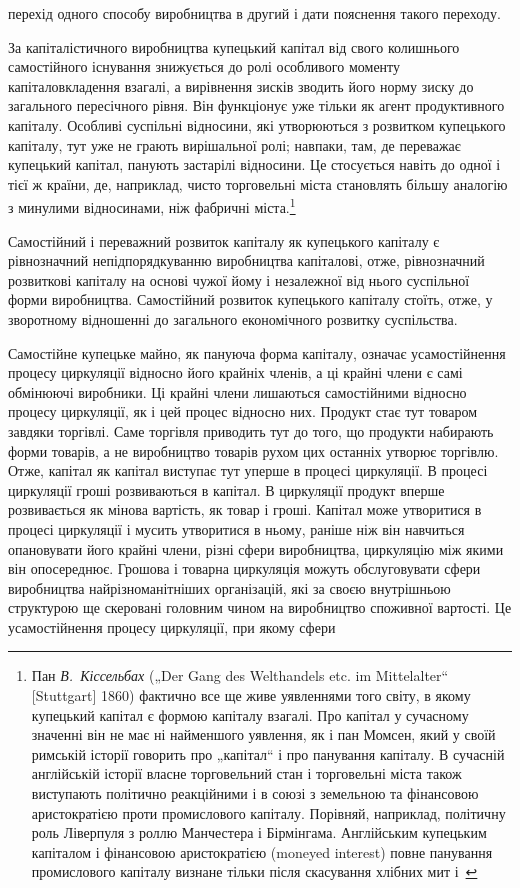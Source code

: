 \parcont{}  %
перехід одного способу виробництва в другий і дати пояснення
такого переходу.

За капіталістичного виробництва купецький капітал від свого
колишнього самостійного існування знижується до ролі особливого
моменту капіталовкладення взагалі, а вирівнення зисків
зводить його норму зиску до загального пересічного рівня. Він
функціонує уже тільки як агент продуктивного капіталу. Особливі
суспільні відносини, які утворюються з розвитком купецького
капіталу, тут уже не грають вирішальної ролі; навпаки, там,
де переважає купецький капітал, панують застарілі відносини.
Це стосується навіть до одної і тієї ж країни, де, наприклад,
чисто торговельні міста становлять більшу аналогію з минулими
відносинами, ніж фабричні міста.\footnote{
Пан \emph{В.~Кіссельбах} („Der Gang des Welthandels etc. im Mittelalter“ [Stuttgart]
1860) фактично все ще живе уявленнями того світу, в якому купецький
капітал є формою капіталу взагалі. Про капітал у сучасному значенні він не
має ні найменшого уявлення, як і пан Момсен, який у своїй римській історії
говорить про „капітал“ і про панування капіталу. В сучасній англійській історії
власне торговельний стан і торговельні міста також виступають політично
реакційними і в союзі з земельною та фінансовою аристократією проти промислового
капіталу. Порівняй, наприклад, політичну роль Ліверпуля з роллю Манчестера
і Бірмінгама. Англійським купецьким капіталом і фінансовою аристократією
(moneyed interest) повне панування промислового капіталу визнане
тільки після скасування хлібних мит і~
}

Самостійний і переважний розвиток капіталу як купецького
капіталу є рівнозначний непідпорядкуванню виробництва капіталові,
отже, рівнозначний розвиткові капіталу на основі чужої
йому і незалежної від нього суспільної форми виробництва. Самостійний
розвиток купецького капіталу стоїть, отже, у зворотному
відношенні до загального економічного розвитку суспільства.

Самостійне купецьке майно, як пануюча форма капіталу,
означає усамостійнення процесу циркуляції відносно його крайніх
членів, а ці крайні члени є самі обмінюючі виробники. Ці крайні
члени лишаються самостійними відносно процесу циркуляції, як
і цей процес відносно них. Продукт стає тут товаром завдяки
торгівлі. Саме торгівля приводить тут до того, що продукти
набирають форми товарів, а не виробництво товарів рухом цих
останніх утворює торгівлю. Отже, капітал як капітал виступає тут
уперше в процесі циркуляції. В процесі циркуляції гроші розвиваються
в капітал. В циркуляції продукт вперше розвивається
як мінова вартість, як товар і гроші. Капітал може утворитися
в процесі циркуляції і мусить утворитися в ньому, раніше ніж
він навчиться опановувати його крайні члени, різні сфери виробництва,
циркуляцію між якими він опосереднює. Грошова і товарна
циркуляція можуть обслуговувати сфери виробництва найрізноманітніших
організацій, які за своєю внутрішньою структурою
ще скеровані головним чином на виробництво споживної
вартості. Це усамостійнення процесу циркуляції, при якому сфери
\parbreak{}  %
